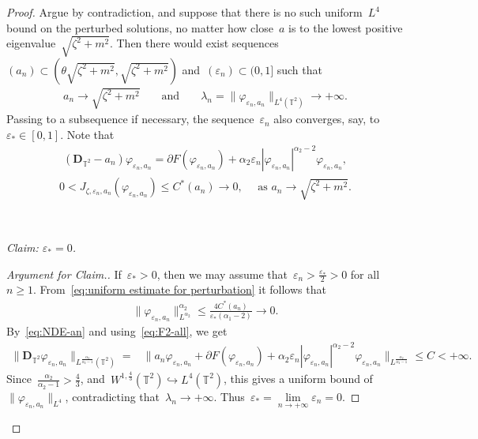 \documentclass[10pt,a4paper]{amsart}
\newcommand{\p}{\partial}
\newcommand{\T}{\mathbb{T}}
\newcommand{\eps}{\varepsilon}
\newcommand{\pD}{\mathbf{D}}
\begin{document}
\begin{proof}
Argue by contradiction, and suppose that there is no such uniform~$L^4$ bound on the perturbed solutions, no matter how close~$a$ is to the lowest positive eigenvalue~$\sqrt{\zeta^2+m^2}$. 
Then there would exist sequences~$(a_n)\subset (\theta\sqrt{\zeta^2+m^2},\sqrt{\zeta^2+m^2})$ and~$(\eps_n)\subset (0,1]$ such that
\begin{align}
    a_n\to\sqrt{\zeta^2+m^2}
    & & \mbox{ and } & &
    \lambda_n=\|\varphi_{\eps_n,a_n}\|_{L^4(\T^2)}\to+\infty. 
\end{align}
Passing to a subsequence if necessary, the sequence~$\eps_n$ also converges, say, to~$\eps_*\in [0,1]$. 
Note that 
\begin{align}\label{eq:NDE-an}
    (\pD_{\T^2} -a_n) \varphi_{\eps_n,a_n} 
    = \p F(\varphi_{\eps_n,a_n}) 
    + \alpha_2 \eps_n |\varphi_{\eps_n,a_n}|^{\alpha_2 -2} \varphi_{\eps_n,a_n}, 
\end{align}
\begin{align}
    0<J_{\zeta,\eps_n,a_n} (\varphi_{\eps_n,a_n})  \leq C^*(a_n) \to 0, \quad \mbox{ as } a_n \to \sqrt{\zeta^2+m^2}. 
\end{align}

\ 

\emph{Claim: $\eps_*=0$.}
\begin{proof}[Argument for Claim.] If~$\eps_*>0$, then we may assume that~$\eps_n>\frac{\eps_*}{2}>0$ for all~$n\geq 1$. 
    From~\eqref{eq:uniform estimate for perturbation} it follows that
    \begin{align}
        \|\varphi_{\eps_n,a_n}\|_{L^{\alpha_2}}^{\alpha_2} \leq \frac{4C^*(a_n)}{\eps_*(\alpha_1 -2)} \to 0.
    \end{align}
    By~\eqref{eq:NDE-an} and using~\eqref{eq:F2-all}, we get 
    \begin{align}
        \|\pD_{\T^2} \varphi_{\eps_n,a_n}\|_{L^{\frac{\alpha_2}{\alpha_2 -1}}(\T^2)}
        =& \| a_n \varphi_{\eps_n,a_n} +\p F(\varphi_{\eps_n,a_n}) 
    + \alpha_2 \eps_n |\varphi_{\eps_n,a_n}|^{\alpha_2 -2} \varphi_{\eps_n,a_n} \|_{L^{\frac{\alpha_2}{\alpha_2-1}}} \leq C<+\infty. 
    \end{align}
    Since~$\frac{\alpha_2}{\alpha_2 -1}>\frac{4}{3}$, and~$W^{1,\frac{4}{3}}(\T^2)\hookrightarrow L^4(\T^2)$, this gives a uniform bound of~$\|\varphi_{\eps_n,a_n}\|_{L^4}$, contradicting that~$\lambda_n\to+\infty$.
    Thus~$\eps_* =\lim\limits_{n\to+\infty} \eps_n =0$. 
\end{proof}



\end{proof}
\end{document}

